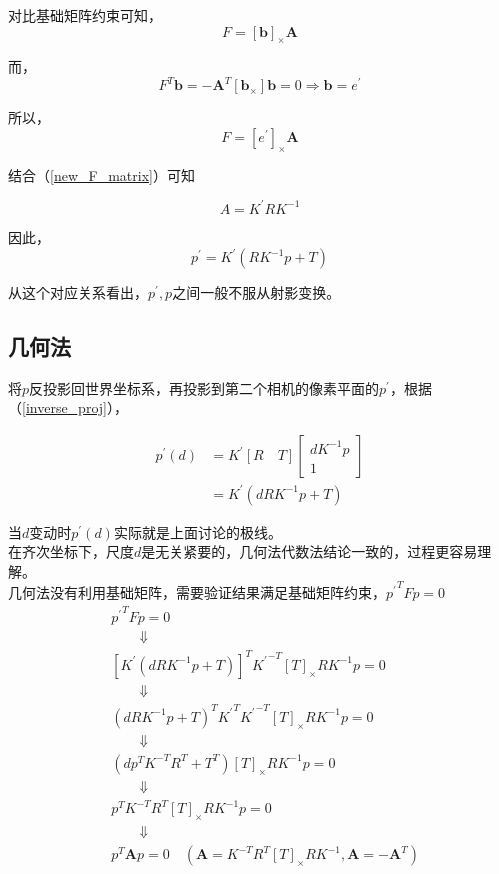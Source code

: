		对比基础矩阵约束可知， 
		$$ 
			F = [\mathbf{b}]_{\times} \mathbf{A} 
		$$

		而，
		$$
			F^T \mathbf{b} = -\mathbf{A}^T[\mathbf{b}_{\times}]\mathbf{b} = 0 \Rightarrow \mathbf{b} = e^{\prime}
		$$

		所以，
		$$
			F = [e^\prime]_{\times} \mathbf{A} 
		$$

		结合（\ref{new_F_matrix}）可知

		$$
			A = K^{\prime} R K^{-1}
		$$

		因此，
		$$
			p^\prime  =  K^{\prime}\left(RK^{-1} p + T\right)
		$$

		从这个对应关系看出，$p^\prime,p$之间一般不服从射影变换。

	\subsection*{几何法}
		
		将$p$反投影回世界坐标系，再投影到第二个相机的像素平面的$p^\prime$，根据（\ref{inverse_proj}），

		\begin{align}
			p^{\prime}(d) &= K^{\prime}[R\quad T]
			\begin{bmatrix}
				dK^{-1}p\\
				1
			\end{bmatrix}\\
			&= K^{\prime}\left(dRK^{-1}p + T\right)\label{f_inverse}
		\end{align}

		当$d$变动时$p^{\prime}(d)$实际就是上面讨论的极线。\\

		在齐次坐标下，尺度$d$是无关紧要的，几何法代数法结论一致的，过程更容易理解。\\

		几何法没有利用基础矩阵，需要验证结果满足基础矩阵约束，${p^{\prime}}^T F p = 0$
		\begin{align*}
			&{p^{\prime}}^T F p = 0\\
			&\quad\quad\Downarrow\\
			&\left[
				K^{\prime}\left(dRK^{-1}p + T\right)
			\right]^{T} 
			{K^{\prime}}^{-T} [T]_{\times} R K^{-1}p = 0\\
			&\quad\quad\Downarrow\\
			&\left(
				dRK^{-1}p + T
			\right)^{T} {K^{\prime}}^T {K^{\prime}}^{-T} [T]_{\times} R K^{-1}p = 0\\
			&\quad\quad\Downarrow\\
			&\left(dp^TK^{-T}R^T + T^T\right) [T]_{\times} R K^{-1}p = 0\\
			&\quad\quad\Downarrow\\
			&p^TK^{-T}R^T [T]_{\times} R K^{-1}p = 0\\
			&\quad\quad\Downarrow \\
			&p^T\mathbf{A}p = 0	\quad\left(\mathbf{A}= K^{-T} R^T [T]_{\times} R K^{-1},\mathbf{A} = -\mathbf{A}^T\right)
		\end{align*}


